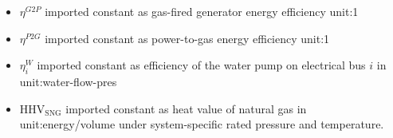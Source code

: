 \begin{itemize}

\item $\eta^{G2P}$ \gls{imported} constant as gas-fired generator
energy efficiency \gls{unit:1}

\item $\eta^{P2G}$ \gls{imported} constant as power-to-gas energy efficiency
  \gls{unit:1}

\item $\eta^W_i$ \gls{imported} constant as efficiency of the water pump on
  electrical bus $i$ in \gls{unit:water-flow-pres}

\item $\text{HHV}_\text{SNG}$ \gls{imported}
constant as heat value of natural gas in \gls{unit:energy/volume} under
  system-specific rated pressure and temperature.

\end{itemize}
